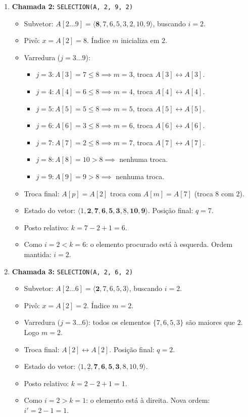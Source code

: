 \documentclass[11pt,a4paper]{article}
\begin{document}
\begin{enumerate}
    \item \textbf{Chamada 2:} \texttt{SELECTION(A, 2, 9, 2)}
    \begin{itemize}
        \item Subvetor: $A[2 \dots 9] = \langle \mathbf{8}, 7, 6, 5, 3, 2, 10, 9 \rangle$, buscando $i = 2$.
        \item Pivô: $x = A[2] = 8$. Índice $m$ inicializa em $2$.
        \item Varredura ($j = 3 \dots 9$):
        \begin{itemize}
            \item $j=3: A[3]=7 \le 8 \implies m=3$, troca $A[3] \leftrightarrow A[3]$.
            \item $j=4: A[4]=6 \le 8 \implies m=4$, troca $A[4] \leftrightarrow A[4]$.
            \item $j=5: A[5]=5 \le 8 \implies m=5$, troca $A[5] \leftrightarrow A[5]$.
            \item $j=6: A[6]=3 \le 8 \implies m=6$, troca $A[6] \leftrightarrow A[6]$.
            \item $j=7: A[7]=2 \le 8 \implies m=7$, troca $A[7] \leftrightarrow A[7]$.
            \item $j=8: A[8]=10 > 8 \implies$ nenhuma troca.
            \item $j=9: A[9]=9 > 8 \implies$ nenhuma troca.
        \end{itemize}
        \item Troca final: $A[p]=A[2]$ troca com $A[m]=A[7]$ (troca $8$ com $2$).
        \item Estado do vetor: $\langle 1, \mathbf{2, 7, 6, 5, 3}, \underline{8}, \mathbf{10, 9} \rangle$. Posição final: $q = 7$.
        \item Posto relativo: $k = 7 - 2 + 1 = 6$.
        \item Como $i = 2 < k = 6$: o elemento procurado está à esquerda. Ordem mantida: $i = 2$.
    \end{itemize}

    \item \textbf{Chamada 3:} \texttt{SELECTION(A, 2, 6, 2)}
    \begin{itemize}
        \item Subvetor: $A[2 \dots 6] = \langle \mathbf{2}, 7, 6, 5, 3 \rangle$, buscando $i = 2$.
        \item Pivô: $x = A[2] = 2$. Índice $m = 2$.
        \item Varredura ($j = 3 \dots 6$): todos os elementos $\{7, 6, 5, 3\}$ são maiores que $2$. Logo $m = 2$.
        \item Troca final: $A[2] \leftrightarrow A[2]$. Posição final: $q = 2$.
        \item Estado do vetor: $\langle 1, \underline{2}, \mathbf{7, 6, 5, 3}, 8, 10, 9 \rangle$.
        \item Posto relativo: $k = 2 - 2 + 1 = 1$.
        \item Como $i = 2 > k = 1$: o elemento está à direita. Nova ordem: $i' = 2 - 1 = 1$.
    \end{itemize}


\end{enumerate}
\end{document}
